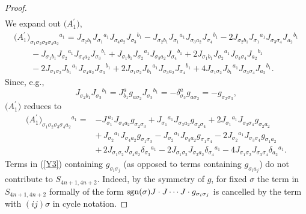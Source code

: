 \documentclass[10pt,a4paper]{amsart}
\numberwithin{equation}{section}
\theoremstyle{definition}
\newcommand{\sgn}{{\rm sgn}}
\begin{document}
\begin{proof}
\begin{gather*}
\end{gather*}
We expand out $\bigl(A_1^\prime\bigr)$,
\begin{gather*}
{\bigl({A_1^\prime}\bigr)_{\sigma_1 \sigma_2 \sigma_3 \sigma_4 a_2}{}^{a_1} }
= J_{\sigma_2 b_1} J_{\sigma_1}{}^{a_1} J_{\sigma_4 a_2} J_{\sigma_3}{}^{b_1}
 -J_{\sigma_2 b_1} J_{\sigma_1}{}^{a_1} J_{\sigma_3 a_2} J_{\sigma_4}{}^{b_1}
 -2 J_{\sigma_2 b_1} J_{\sigma_1}{}^{a_1} J_{\sigma_3 \sigma_4} J_{a_2}{}^{b_1} \\ \nonumber
\qquad{}
 -J_{\sigma_1 b_1} J_{\sigma_2}{}^{a_1} J_{\sigma_4 a_2} J_{\sigma_3}{}^{b_1}
 +J_{\sigma_1 b_1} J_{\sigma_2}{}^{a_1} J_{\sigma_3 a_2} J_{\sigma_4}{}^{b_1}
 +2 J_{\sigma_1 b_1} J_{\sigma_2}{}^{a_1} J_{\sigma_3 \sigma_4} J_{a_2}{}^{b_1}
\\ \nonumber
\qquad{}
 -2J_{\sigma_1 \sigma_2} J_{b_1}{}^{a_1} J_{\sigma_4 a_2} J_{\sigma_3}{}^{b_1}
 +2J_{\sigma_1 \sigma_2} J_{b_1}{}^{a_1} J_{\sigma_3 a_2} J_{\sigma_4}{}^{b_1}
 +4 J_{\sigma_1 \sigma_2} J_{b_1}{}^{a_1} J_{\sigma_3 \sigma_4} J_{a_2}{}^{b_1 }.
 \end{gather*}
Since, e.g.,
\begin{equation}\label{eq:minus}
J_{\sigma_2 b_1}J_{\sigma_3}{}^{b_1} = J^{a}_{b_1} g_{a\sigma_2}J_{\sigma_3}{}^{b_1}
= -\delta^a_{\sigma_3} g_{a\sigma_2} =- g_{\sigma_2 \sigma_3},
\end{equation}
$\bigl(A_1^\prime\bigr)$ reduces to
\begin{align}
\bigl({A_1^\prime}\bigr)_{\sigma_1 \sigma_2 \sigma_3 \sigma_4 a_2}{}^{a_1}
={}& {-}J_{\sigma_1}^{\ a_1} J_{\sigma_4 a_2} g_{\sigma_2 \sigma_3}
+J_{\sigma_1}{}^{a_1} J_{\sigma_3 a_2} g_{\sigma_2 \sigma_4}
+2 J_{\sigma_1}{}^{a_1} J_{\sigma_3 \sigma_4} g_{\sigma_2 a_2}
 \nonumber\\
&{+}\, J_{\sigma_2}{}^{a_1} J_{\sigma_4 a_2} g_{\sigma_1 \sigma_3}
- J_{\sigma_2}{}^{a_1} J_{\sigma_3 a_2} g_{\sigma_1 \sigma_4}
-2 J_{\sigma_2}{}^{a_1} J_{\sigma_3 \sigma_4} g_{\sigma_1 a_2}\nonumber
\\
&{+}\, 2J_{\sigma_1 \sigma_2} J_{\sigma_4 a_2}\delta_{\sigma_3}{}^{a_1}
-2J_{\sigma_1 \sigma_2} J_{\sigma_3 a_2}\delta_{\sigma_4}{}^{a_1}
-4J_{\sigma_1 \sigma_2} J_{\sigma_3 \sigma_4}\delta_{a_2}{}^{a_1}.\label{Y3}
\end{align}
Terms in (\ref{Y3}) containing $g_{\sigma_i\sigma_j}$ (as opposed to terms containing
$g_{\sigma_i a_j}$) do not contribute to $S_{4n+1,4n+2}$. Indeed, by the symmetry of $g$,
for fixed $\sigma$ the term in $S_{4n+1,4n+2}$ formally of the form
$\sgn(\sigma) J\cdot J\cdots J\cdot g_{\sigma_i\sigma_j}$ is
 cancelled by the term with
$ (ij)\sigma$ in cycle notation.


\end{proof}
\end{document}
